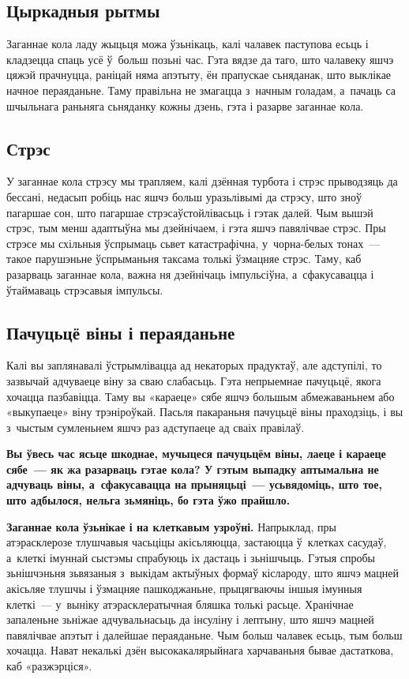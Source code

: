 \subsection*{Цыркадныя рытмы}

Заганнае кола ладу жыцьця можа ўзьнікаць, калі чалавек паступова есьць і кладзецца спаць усё ў~больш позьні час. Гэта вядзе да таго, што чалавеку яшчэ цяжэй прачнуцца, раніцай няма апэтыту, ён прапускае сьняданак, што выклікае начное пераяданьне. Таму правільна не змагацца з~начным голадам, а~пачаць са шчыльнага раньняга сьняданку кожны дзень, гэта і разарве заганнае кола.

\subsection*{Стрэс}

У заганнае кола стрэсу мы трапляем, калі дзённая турбота і стрэс прыводзяць да бессані, недасып робіць нас яшчэ больш уразьлівымі да стрэсу, што зноў пагаршае сон, што пагаршае стрэсаўстойлівасьць і гэтак далей. Чым вышэй стрэс, тым менш адаптыўна мы дзейнічаем, і гэта яшчэ павялічвае стрэс. Пры стрэсе мы схільныя ўспрымаць сьвет катастрафічна, у~чорна-белых тонах~--- такое парушэньне ўспрыманьня таксама толькі ўзмацняе стрэс. Таму, каб разарваць заганнае кола, важна ня дзейнічаць імпульсіўна, а~сфакусавацца і ўтаймаваць стрэсавыя імпульсы.

\subsection*{Пачуцьцё віны і пераяданьне}

Калі вы заплянавалі ўстрымлівацца ад некаторых прадуктаў, але адступілі, то зазвычай адчуваеце віну за сваю слабасьць. Гэта непрыемнае пачуцьцё, якога хочацца пазбавіцца. Таму вы «караеце» сябе яшчэ большым абмежаваньнем або «выкупаеце» віну трэніроўкай. Пасьля пакараньня пачуцьцё віны праходзіць, і вы з~чыстым сумленьнем яшчэ раз адступаеце ад сваіх правілаў. 

\textbf{Вы ўвесь час ясьце шкоднае, мучыцеся пачуцьцём віны, лаеце і караеце сябе~--- як жа разарваць гэтае кола? У гэтым выпадку аптымальна не адчуваць віны, а~сфакусавацца на прыняцьці~--- усьвядоміць, што тое, што адбылося, нельга зьмяніць, бо гэта ўжо прайшло.}

\textbf{Заганнае кола ўзьнікае і на клеткавым узроўні.} Напрыклад, пры атэрасклерозе тлушчавыя часьціцы акісьляюцца, застаюцца ў~клетках сасудаў, а~клеткі імуннай сыстэмы спрабуюць іх дастаць і зьнішчыць. Гэтыя спробы зьнішчэньня зьвязаныя з~выкідам актыўных формаў кіслароду, што яшчэ мацней акісьляе тлушчы і ўзмацняе пашкоджаньне, прыцягваючы іншыя імунныя клеткі~--- у~выніку атэрасклератычная бляшка толькі расьце. Хранічнае запаленьне зьніжае адчувальнасьць да інсуліну і лептыну, што яшчэ мацней павялічвае апэтыт і далейшае пераяданьне. Чым больш чалавек есьць, тым больш хочацца. Нават некалькі дзён высокакалярыйнага харчаваньня бывае дастаткова, каб «разжэрціся».

